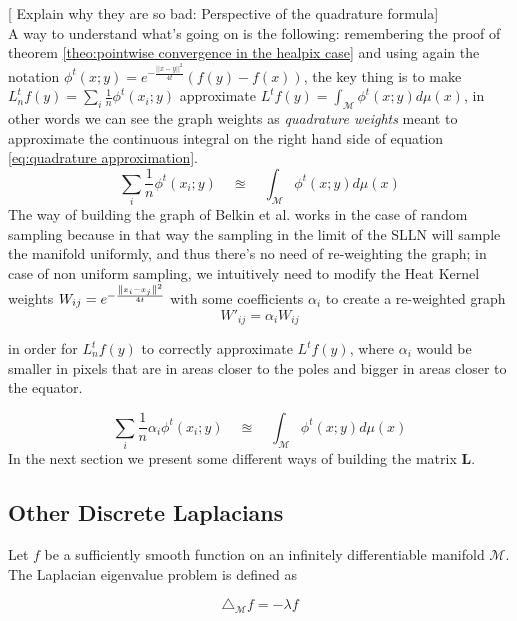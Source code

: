 [ Explain why they are so bad: Perspective of the quadrature formula]\\
A way to understand what's going on is the following: remembering the proof of theorem \ref{theo:pointwise convergence in the healpix case} and using again the notation $\phi^{t}(x ; y)=e^{-\frac{||x-y||^2}{4t}}\left(f(y)-f(x)\right)$, the key thing is to make $L_n^tf(y)=\sum_i \frac{1}{n} \phi^{t}(x_i ; y)$  approximate $L^tf(y)=\int_\mathcal M\phi^{t}(x ; y)d\mu(x)$, in other words we can see the graph weights as \textit{quadrature weights} meant to approximate the continuous integral on the right hand side of equation \ref{eq:quadrature approximation}.
\begin{equation}
\label{eq:quadrature approximation}
	\sum_i \frac{1}{n} \phi^{t}(x_i ; y) \quad \approxeq\quad \int_\mathcal M\phi^{t}(x ; y)d\mu(x)
\end{equation}
The way of building the graph of Belkin et al. works in the case of random sampling because in that way the sampling in the limit of the SLLN will sample the manifold uniformly, and thus there's no need of re-weighting the graph; in case of non uniform sampling, we intuitively need to modify the Heat Kernel weights $W_{i j}=e^{-\frac{\left\lVert x_i-x_j\right\rVert^2}{4t}}$ with some coefficients $\alpha_i$ to create a re-weighted graph 
$$
W'_{i j} = \alpha_i W_{i j}
$$

in order for $L_n^tf(y)$ to correctly approximate $L^tf(y)$, where $\alpha_i$ would be smaller in pixels that are in areas closer to the poles and bigger in areas closer to the equator. 

\begin{equation}
\label{eq:quadrature approximation 2}
\sum_i \frac{1}{n} \alpha_i \phi^{t}(x_i ; y) \quad \approxeq\quad \int_\mathcal M  \phi^{t}(x ; y)d\mu(x)
\end{equation}
In the next section we present some different ways of building the matrix $\mathbf L$.

\clearpage
\subsection{Other Discrete Laplacians}\label{sec:Chapter3: other discrete laplacians}
Let $f$ be a sufficiently smooth function on an infinitely differentiable manifold $\mathcal M$. The Laplacian eigenvalue problem is defined as 

\begin{equation}\label{eq:continous eigenvalue problem}
	\triangle_{\mathcal M}f  = -\lambda f
\end{equation}


